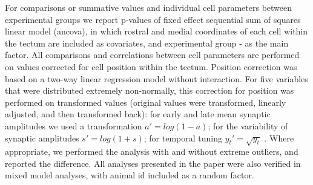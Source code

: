 \documentclass{article}
\begin{document}
For comparisons or summative values and individual cell parameters between experimental groups we report p-values of fixed effect sequential sum of squares linear model (ancova), in which rostral and medial coordinates of each cell within the tectum are included as covariates, and experimental group - as the main factor. All comparisons and correlations between cell parameters are performed on values corrected for cell position within the tectum. Position correction was based on a two-way linear regression model without interaction. For five variables that were distributed extremely non-normally, this correction for position was performed on transformed values (original values were transformed, linearly adjusted, and then transformed back): for early and late mean synaptic amplitudes we used a transformation $a'=log(1-a)$; for the variability of synaptic amplitudes $s'=log(1+s)$; for temporal tuning $y_t' = \sqrt{y_t}$ . Where appropriate, we performed the analysis with and without extreme outliers, and reported the difference. All analyses presented in the paper were also verified in mixed model analyses, with animal id included as a random factor.

\nolinenumbers


\end{document}
